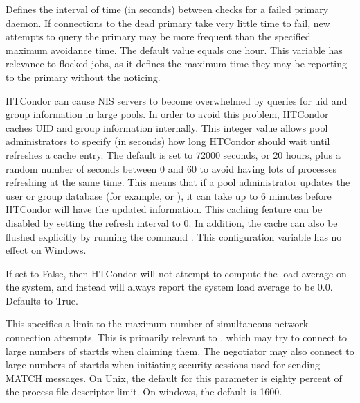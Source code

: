 \begin{description}
\label{param:DeadCollectorMaxAvoidanceTime}
\item[\Macro{DEAD\_COLLECTOR\_MAX\_AVOIDANCE\_TIME}]
  Defines the interval of time
  (in seconds) between checks for a failed primary  daemon.
  If connections to the dead primary  take very
  little time to fail, new attempts to query the primary  may
  be more frequent than the specified maximum avoidance time.
  The default value equals one hour.
  This variable has relevance to flocked jobs, as it defines 
  the maximum time they may be reporting to the primary 
  without the  noticing.

\label{param:PasswdCacheRefresh}
\item[\Macro{PASSWD\_CACHE\_REFRESH}]
  HTCondor can cause NIS servers to become overwhelmed by queries for uid
  and group information in large pools. In order to avoid this problem,
  HTCondor caches UID and group information internally. This integer value allows
  pool administrators to specify (in seconds) how long HTCondor should wait
  until refreshes a cache entry. The default is set to 72000 seconds, or
  20 hours, plus a random number of seconds between 0 and 60 to avoid
  having lots of processes refreshing at the same time.
  This means that if a pool administrator updates the user
  or group database (for example,  or ),
  it can take up
  to 6 minutes before HTCondor will have the updated information. This
  caching feature can be disabled by setting the refresh interval to
  0. In addition, the cache can also be flushed explicitly by running
  the command .
  This configuration variable has no effect on Windows.

\label{param:SysapiGetLoadavg}
\item[\Macro{SYSAPI\_GET\_LOADAVG}]
  If set to False, then HTCondor will not attempt to compute the load average
  on the system, and instead will always report the system load average
  to be 0.0.  Defaults to True.

\label{param:NetworkMaxPendingConnects}
\item[\Macro{NETWORK\_MAX\_PENDING\_CONNECTS}]
  This specifies a limit to the maximum number of simultaneous network
  connection attempts.  This is primarily relevant to ,
  which may try to connect to large numbers of startds when claiming
  them.  The negotiator may also connect to large numbers of startds
  when initiating security sessions used for sending MATCH messages.  On
  Unix, the default for this parameter is eighty percent of the process file
  descriptor limit.  On windows, the default is 1600.


\end{description}

